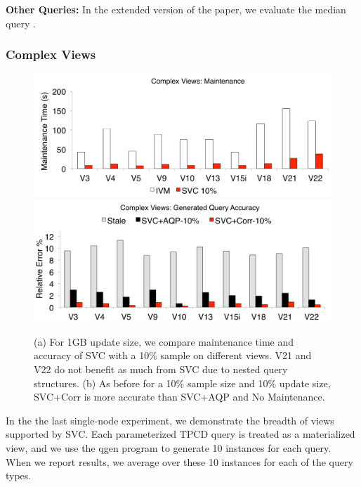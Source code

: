 \textbf{Other Queries: } In the extended version of the paper, we evaluate the median query .

\subsubsection{Complex Views}

\begin{figure}[t]
\centering
 \includegraphics[scale=0.10]{exp/msqv_1.pdf}
 \includegraphics[scale=0.10]{exp/msqv_2.pdf}
 \caption{(a) For 1GB update size, we compare maintenance time and accuracy of SVC with a 10\% sample on different views. V21 and V22 do not benefit as much from SVC due to nested query structures. (b) As before for a 10\% sample size and 10\% update size, SVC+Corr is more accurate than SVC+AQP and No Maintenance.  \label{exp3-acc}}
\end{figure}
In the the last single-node experiment, we demonstrate the breadth of views supported by SVC.
Each parameterized TPCD query is treated as a materialized view, and we use the \textsf{qgen} program 
to generate 10 instances for each query.
When we report results, we average over these 10 instances for each of the query types.

